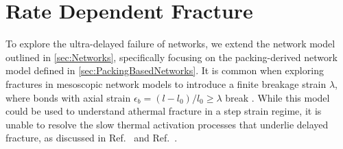 \documentclass[asymmetricmargins]{library/duthesis}%
\begin{document}


\section{Rate Dependent Fracture} \label{sec:BoltzmanFracture}
To explore the ultra-delayed failure of networks, we extend the network model outlined in \cref{sec:Networks}, specifically focusing on the packing-derived network model defined in \cref{sec:PackingBasedNetworks}. It is common when exploring fractures in mesoscopic network models to introduce a finite breakage strain $\lambda$, where bonds with axial strain $\epsilon_b=(l-l_0)/l_0 \geq \lambda$ break \cite{tauber_stretchy_2022}. While this model could be used to understand athermal fracture in a step strain regime, it is unable to resolve the slow thermal activation processes that underlie delayed fracture, as discussed in Ref.~\cite{lockwood_ultradelayed_2025} and Ref.~\cite{lockwood_yielding_nodate}.

\end{document}
